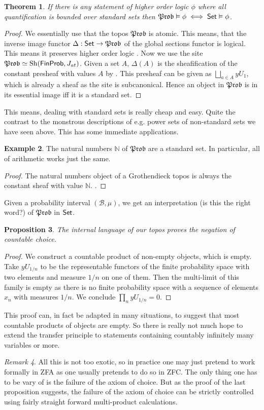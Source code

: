 \documentclass[a4paper]{amsproc}
\theoremstyle{plain}
\newtheorem{theorem}{Theorem}[section]
\newtheorem{proposition}[theorem]{Proposition}
\theoremstyle{definition}
\newtheorem{example}[theorem]{Example}
\theoremstyle{remark}
\newtheorem{remark}[theorem]{Remark}
\numberwithin{equation}{section}
\DeclareMathOperator{\Sh}{Sh}
\newcommand{\Set}{\textup{\textsf{Set}}}
\newcommand{\FinProb}{\textup{\textsf{FinProb}}}
\newcommand{\Prob}{\mathfrak{Prob}}
\begin{document}
\begin{theorem} If there is any statement of higher order logic $\phi$ where all quantification is bounded over \emph{standard} sets then $\Prob\vDash \phi \iff \text{\Set}\vDash \phi$.
\end{theorem}
\begin{proof}
We essentially use that the topos $\Prob$ is atomic. This means, that the inverse image functor $\Delta: \text{\Set}\rightarrow \Prob$ of the global sections functor is logical. This means it preserves higher order logic \cite{XYZ}. Now we use the site $\Prob\simeq \Sh(\FinProb,J_{at})$. Given a set $A$, $\Delta(A)$ is the sheafification of the constant presheaf with values $A$ by \cite{XYZ}. This presheaf can be given as $\bigsqcup_{a\in A}yU_1$, which is already a sheaf as the site is subcanonical.
Hence an object in $\Prob$ is in its essential image iff it is a standard set.
\end{proof}
This means, dealing with standard sets is really cheap and easy. Quite the contrast to the monstrous descriptions of e.g. power sets of non-standard sets we have seen above. This has some immediate applications.
\begin{example} The natural numbers $\mathbb{N}$ of $\Prob$ are a standard set. In particular, all of arithmetic works just the same. %
\end{example}
\begin{proof}
The natural numbers object of a Grothendieck topos is always the constant sheaf with value $\mathbb{N}$. \cite{XYZ}.
\end{proof}
Given a probability interval $(\mathcal{B},\mu)$, we get an interpretation (is this the right word?) of $\Prob$ in $\text{\Set}$. %
\begin{proposition}\label{choice_failture} The internal language of our topos proves the negation of countable choice.
\end{proposition}
\begin{proof} We construct a countable product of non-empty objects, which is empty. Take $yU_{1/n}$ to be the representable functors of the finite probability space with two elements and measure $1/n$ on one of them. Then the multi-limit of this family is empty as there is no finite probability space with a sequence of elements $x_n$ with measures $1/n$. We conclude $\prod_n yU_{1/n}=0$.
\end{proof}

This proof can, in fact be adapted in many situations, to suggest that most countable products of objects are empty. So there is really not much hope to extend the transfer principle to statements containing countably infinitely many variables or more.
\begin{remark} All this is not too exotic, so in practice one may just pretend to work formally in ZFA as one usually pretends to do so in ZFC. The only thing one has to be vary of is the failure of the axiom of choice. But as the proof of the last proposition suggests, the failure of the axiom of choice can be strictly controlled using fairly straight forward multi-product calculations.
\end{remark}
\end{document}
